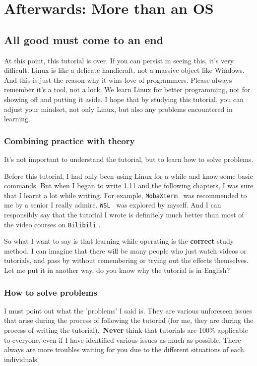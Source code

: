 \documentclass[lang=en,color=blue,12pt]{elegantbook}
\let\oldtexttt\texttt
\renewcommand{\texttt}[1]{%
  \begingroup
  \setlength{\fboxsep}{1pt}%
  \colorbox{gray!10}{\oldtexttt{#1}}%
  \endgroup
}
\begin{document}
\chapter*{Afterwards: More than an OS}

\section*{\textbf{All good must come to an end}}

At this point, this tutorial is over. If you can persist in seeing this,
it's very difficult. Linux is like a delicate handicraft, not a massive object
like Windows. And this is just the reason why it wins love of programmers.
Please always remember it's a tool, not a lock. We learn Linux for better
programming, not for showing off and putting it aside. I hope that by
studying this tutorial, you can adjust your mindset, not only Linux, but
also any problems encountered in learning.

\subsection*{\textbf{Combining practice with theory}}

It's not important to understand the tutorial, but to learn how to solve problems.

Before this tutorial, I had only been using Linux for a while and know
some basic commands. But when I began to write 1.11 and the following
chapters, I was sure that I learnt a lot while writing. For example,
\texttt{MobaXterm}\ was recommended to me by a senior I really admire.
\texttt{WSL}\ was explored by myself. And I can responsibly say that
the tutorial I wrote is definitely much better than most of the video
courses on \texttt{Bilibili}.

So what I want to say is that learning while operating is the
\textbf{correct} study method. I can imagine that there will be many
people who just watch videos or tutorials, and pass by without
remembering or trying out the effects themselves. Let me put it in
another way, do you know why the tutorial is in English?

\subsection*{\textbf{How to solve problems}}

I must point out what the 'problems' I said is. They are various unforeseen
issues that arise during the process of following the tutorial (for me, they
are during the process of writing the tutorial).\ \textbf{Never} think that
tutorials are 100\% applicable to everyone, even if I have identified various
issues as much as possible. There always are more troubles waiting for you due
to the different situations of each individuals.
\end{document}
